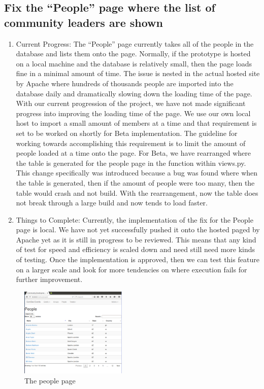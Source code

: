\documentclass[letterpaper,10pt,onecolumn]{IEEEtran} %
\begin{document}
\subsection{Fix the “People” page where the list of community leaders are shown}
\begin{enumerate}[label*=\arabic*.]
\item Current Progress: The “People” page currently takes all of the people in the database and lists them onto the page. Normally, if the prototype is hosted on a local machine and the database is relatively small, then the page loads fine in a minimal amount of time. The issue is nested in the actual hosted site by Apache where hundreds of thousands people are imported into the database daily and dramatically slowing down the loading time of the page. With our current progression of the project, we have not made significant progress into improving the loading time of the page. We use our own local host to import a small amount of members at a time and that requirement is set to be worked on shortly for Beta implementation. The guideline for working towards accomplishing this requirement is to limit the amount of people loaded at a time onto the page. For Beta, we have rearranged where the table is generated for the people page in the function within views.py. This change specifically was introduced because a bug was found where when the table is generated, then if the amount of people were too many, then the table would crash and not build. With the rearrangement, now the table does not break through a large build and now tends to load faster.

\item Things to Complete: Currently, the implementation of the fix for the People page is local. We have not yet successfully pushed it onto the hosted paged by Apache yet as it is still in progress to be reviewed. This means that any kind of test for speed and efficiency is scaled down and need still need more kinds of testing. Once the implementation is approved, then we can test this feature on a larger scale and look for more tendencies on where execution fails for further improvement.
\end{enumerate}

\begin{figure}[htp]
  \begin{center}
  
  \includegraphics[width=2in]{peoplePage}
  \centering
  \caption{The people page}

  \end{center}
\end{figure}
\end{document}
